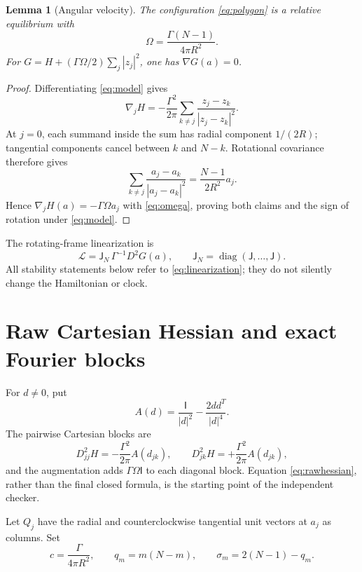 \documentclass[10pt]{article}
\newtheorem{lemma}{Lemma}
\newcommand{\J}{\mathsf J}
\newcommand{\Id}{\mathsf I}
\newcommand{\diag}{\operatorname{diag}}
\begin{document}
\begin{lemma}[Angular velocity]
The configuration \eqref{eq:polygon} is a relative equilibrium with
\begin{equation}
 \Omega=\frac{\Gamma(N-1)}{4\pi R^2}.                       \label{eq:omega}
\end{equation}
For
$G=H+(\Gamma\Omega/2)\sum_j|z_j|^2$, one has $\nabla G(a)=0$.
\end{lemma}

\begin{proof}
Differentiating \eqref{eq:model} gives
\[
 \nabla_jH=-\frac{\Gamma^2}{2\pi}
 \sum_{k\ne j}\frac{z_j-z_k}{|z_j-z_k|^2}.
\]
At $j=0$, each summand inside the sum has radial component $1/(2R)$;
tangential components cancel between $k$ and $N-k$.  Rotational covariance
therefore gives
\[
 \sum_{k\ne j}\frac{a_j-a_k}{|a_j-a_k|^2}
 =\frac{N-1}{2R^2}a_j.
\]
Hence $\nabla_jH(a)=-\Gamma\Omega a_j$ with \eqref{eq:omega}, proving both
claims and the sign of rotation under \eqref{eq:model}.
\end{proof}

The rotating-frame linearization is
\begin{equation}
 \mathcal L=\J_N\,\Gamma^{-1}D^2G(a),
 \qquad \J_N=\diag(\J,\ldots,\J).                           \label{eq:linearization}
\end{equation}
All stability statements below refer to \eqref{eq:linearization}; they do not
silently change the Hamiltonian or clock.

\section{Raw Cartesian Hessian and exact Fourier blocks}

For $d\ne0$, put
\[
 A(d)=\frac{\Id}{|d|^2}-\frac{2dd^T}{|d|^4}.
\]
The pairwise Cartesian blocks are
\begin{equation}
 D^2_{jj}H=-\frac{\Gamma^2}{2\pi}A(d_{jk}),
 \qquad
 D^2_{jk}H=+\frac{\Gamma^2}{2\pi}A(d_{jk}),                \label{eq:rawhessian}
\end{equation}
and the augmentation adds $\Gamma\Omega\Id$ to each diagonal block.
Equation \eqref{eq:rawhessian}, rather than the final closed formula, is the
starting point of the independent checker.

Let $Q_j$ have the radial and counterclockwise tangential unit vectors at
$a_j$ as columns.  Set
\begin{equation}
 c=\frac{\Gamma}{4\pi R^2},\qquad q_m=m(N-m),\qquad
 \sigma_m=2(N-1)-q_m.                                      \label{eq:notation}
\end{equation}
\end{document}

